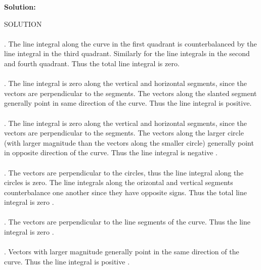 \documentclass[10pt,]{book}
\theoremstyle{plain}
\theoremstyle{definition}
\theoremstyle{definition}
\theoremstyle{definition}
\theoremstyle{definition}
\theoremstyle{definition}
\numberwithin{equation}{section}
\begin{document}
\begin{exerciselist}
\begin{mdframed}
{\par \par {\bf Solution: }\par  SOLUTION \leavevmode\\\relax  \leavevmode\\. The line integral along the curve in the first quadrant is counterbalanced by
the line integral in the third quadrant. Similarly for the line integrals in the second
and fourth quadrant. Thus the total line integral is zero. \leavevmode\\\relax  \leavevmode\\. The line integral is zero along the vertical and horizontal segments, since the
vectors are perpendicular to the segments. The vectors along the slanted segment generally 
point in same direction of the curve. Thus the line integral is positive. \leavevmode\\\relax  \leavevmode\\. The line integral is zero along the vertical and horizontal segments, 
since the vectors are perpendicular to the segments. The vectors along the larger circle
(with larger magnitude than the vectors along the smaller circle) generally point in opposite direction of the curve. Thus the line integral is negative . \leavevmode\\\relax  \leavevmode\\. The vectors are perpendicular to the circles, thus the line integral
along the circles is zero. The line integrals along the orizontal and vertical segments counterbalance one another since they have opposite signs. Thus the total line integral is zero . \leavevmode\\\relax  \leavevmode\\. The vectors are perpendicular to the line segments of the curve. Thus the line integral is zero . \leavevmode\\\relax  \leavevmode\\. Vectors with larger magnitude generally point in the same 
direction of the curve. Thus the line integral is positive . 

}
\end{mdframed}
\end{exerciselist}
\end{document}
